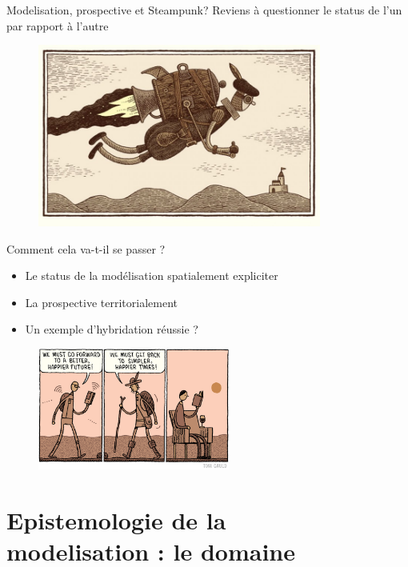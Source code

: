 \documentclass[newPxFont]{beamer}
\begin{document}
\begin{frame}[c]{Modelisation, prospective et Steampunk?}
\vspace{-1cm}
Reviens à questionner le status de l'un par rapport à l'autre
\begin{figure}
  \includegraphics[height=6cm]{img/a_Tom-Gauld-jetpack.jpg}
\end{figure}
\end{frame}

\begin{frame}[c]{Comment cela va-t-il se passer ?}
\vspace{-1cm}
\begin{itemize}
  \item Le status de la modélisation spatialement expliciter
  \item La prospective territorialement
  \item Un exemple d'hybridation réussie ?
\end{itemize}

\begin{figure}
  \includegraphics[height=4cm]{img/a_Tom-Gauld-walk.jpg}
\end{figure}
\end{frame}

\section{Epistemologie de la\\ modelisation : le domaine}
\end{document}
